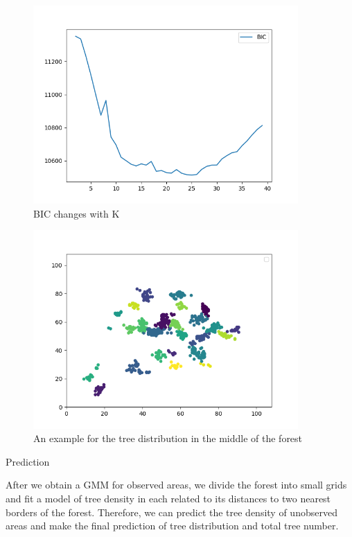 \documentclass[final]{beamer}
\begin{document}
\begin{frame}
\begin{columns}[t]
\begin{column}{\colwidth}
\begin{tcolorbox}[width=\colwidth,height=\contentheight,top=.2in]
\begin{figure}[H]
\includegraphics[width=0.9\textwidth]{bic}
\caption{BIC changes with K}
\end{figure}

\begin{figure}[H]
\includegraphics[width=0.9\textwidth]{trees}
\caption{An example for the tree distribution in the middle of the forest}
\end{figure}

\begin{block}{Prediction}

After we obtain a GMM for observed areas, we divide the forest into small grids and fit a model of tree density in each  related to its distances to two nearest borders of the forest. Therefore, we can predict the tree density of unobserved areas and make the final prediction of tree distribution and total tree number.


\end{block}
\end{tcolorbox}
\end{column}
\end{columns}
\end{frame}
\end{document}
